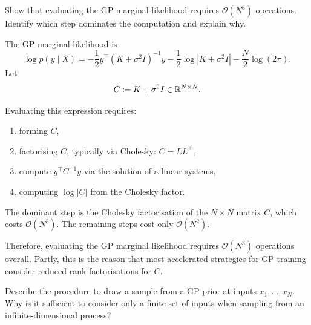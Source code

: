 \begin{exercise}
    Show that evaluating the GP marginal likelihood requires \(\mathcal{O}(N^3)\) operations.
    Identify which step dominates the computation and explain why.
\end{exercise}

\begin{solution}
The GP marginal likelihood is
\[
\log p(y\mid X)
=
-\frac{1}{2}y^\top (K+\sigma^2 I)^{-1}y
-\frac{1}{2}\log |K+\sigma^2 I|
-\frac{N}{2}\log(2\pi).
\]
Let
\[
C \coloneqq K+\sigma^2 I \in {\mathbb R}^{N\times N}.
\]

Evaluating this expression requires:
\begin{enumerate}
    \item forming \(C\),
    \item factorising \(C\), typically via Cholesky: \(C=LL^\top\),
    \item compute \(y^\top C^{-1}y\) via the solution of a linear systems,
    \item computing \(\log|C|\) from the Cholesky factor.
\end{enumerate}

The dominant step is the Cholesky factorisation of the \(N\times N\) matrix \(C\), which costs \(\mathcal O(N^3)\). The remaining steps cost only \(\mathcal O(N^2)\).

Therefore, evaluating the GP marginal likelihood requires \(\mathcal O(N^3)\) operations overall. Partly, this is the reason that most accelerated strategies for GP training consider reduced rank factorisations for $C$.  
\end{solution}


\begin{exercise}
    Describe the procedure to draw a sample from a GP prior at inputs \(x_1,\ldots,x_N\).
    Why is it sufficient to consider only a finite set of inputs when sampling from an infinite-dimensional process?
\end{exercise}

